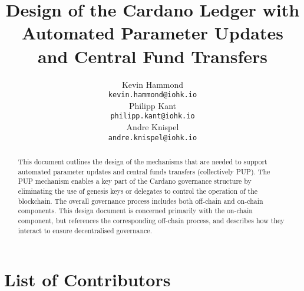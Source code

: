 

\cleardoublepage
\renewcommand{\thepage}{\arabic{page}}
\setcounter{page}{1}

\title{Design of the Cardano Ledger with Automated Parameter Updates and Central Fund Transfers}

\author{
   Kevin Hammond \\ {\small \texttt{kevin.hammond@iohk.io}} \\
   Philipp Kant \\ {\small \texttt{philipp.kant@iohk.io}} \\
   Andre Knispel \\ {\small \texttt{andre.knispel@iohk.io}} \\
   }

\date{}

\maketitle

\begin{abstract}
  This document outlines the design of the mechanisms that are needed to support
  automated parameter updates and central funds transfers (collectively PUP).  The PUP mechanism enables a key part of the Cardano governance structure by
  eliminating the use of genesis keys or delegates to control the operation of the blockchain.  The overall governance process includes both
  off-chain and on-chain components.  This design document is concerned primarily with the on-chain component, but references the corresponding off-chain
  process, and describes how they interact to ensure decentralised governance.
\end{abstract}

\section*{List of Contributors}
\label{acknowledgements}

\begin{changelog}
\end{changelog}
